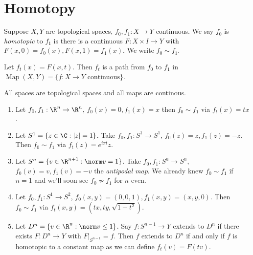 \documentclass[a4paper]{article}
\DeclareMathOperator{\Map}{Map} %
\begin{document}


\tableofcontents

\setcounter{section}{-1}

\section{Homotopy}

\begin{definition}[homotopy]
  Suppose \(X, Y\) are topological spaces, \(f_0, f_1: X \to Y\) continuous. We say \(f_0\) is \emph{homotopic} to \(f_1\) is there is a continuous \(F: X \times I \to Y\) with \(F(x, 0) = f_0(x), F(x, 1) = f_1(x)\). We write \(f_0 \sim f_1\).
\end{definition}

Let \(f_t(x) = F(x, t)\). Then \(f_t\) is a path from \(f_0\) to \(f_1\) in \(\Map(X, Y) = \{f: X \to Y \text{ continuous}\}\).

\begin{convention}
  All spaces are topological spaces and all maps are continous.
\end{convention}

\begin{eg}\leavevmode
  \begin{enumerate}
  \item Let \(f_0, f_1: \R^n \to \R^n\), \(f_0(x) = 0, f_1(x) = x\) then \(f_0 \sim f_1\) via \(f_t(x) = tx\).
  \item Let \(S^1 = \{z \in \C: |z| = 1\}\). Take \(f_0, f_1: S^1 \to S^1\), \(f_0(z) = z, f_1(z) = -z\). Then \(f_0 \sim f_1\) via \(f_t(z) = e^{i\pi t}z\).
  \item Let \(S^n = \{v \in \R^{n + 1}: \norm v = 1\}\). Take \(f_0, f_1: S^n \to S^n\), \(f_0(v) = v, f_1(v) = -v\) the \emph{antipodal map}. We already knew \(f_0 \sim f_1\) if \(n = 1\) and we'll soon see \(f_0 \nsim f_1\) for \(n\) even.
  \item Let \(f_0, f_1: S^1 \to S^2\), \(f_0(x, y) = (0, 0, 1), f_1(x, y) = (x, y, 0)\). Then \(f_0 \sim f_1\) via \(f_t(x, y) = (tx, ty, \sqrt{1 - t^2})\).
  \item Let \(D^n = \{v \in \R^n: \norm v \leq 1\}\). Say \(f: S^{n - 1} \to Y\) extends to \(D^n\) if there exists \(F: D^n \to Y\) with \(F|_{S^{n - 1}} = f\). Then \(f\) extends to \(D^n\) if and only if \(f\) is homotopic to a constant map as we can define \(f_t(v) = F(tv)\).
  \end{enumerate}
\end{eg}
\end{document}
